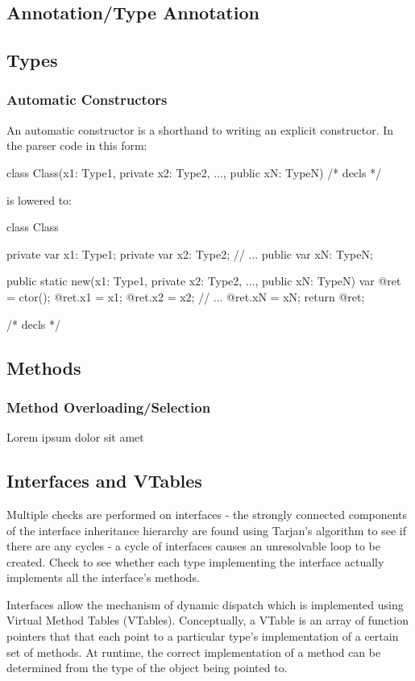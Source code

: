 \documentclass{article}
\begin{document}
\subsection{Annotation/Type Annotation}

\subsection{Types}
\subsubsection{Automatic Constructors}
An automatic constructor is a shorthand to writing an explicit constructor. In the parser code in this form:
\begin{sooplisting}
class Class(x1: Type1, private x2: Type2, ..., public xN: TypeN) { /* decls */ }
\end{sooplisting}
is lowered to:
\begin{sooplisting}
class Class {
	private var x1: Type1;
	private var x2: Type2;
	// ...
	public var xN: TypeN;
	
	public static new(x1: Type1, private x2: Type2, ..., public xN: TypeN) {
		var @ret = ctor();
		@ret.x1 = x1;
		@ret.x2 = x2;
		// ...
		@ret.xN = xN;
		return @ret;
	}
	
	/* decls */
}
\end{sooplisting}

\subsection{Methods}
\subsubsection{Method Overloading/Selection}
\label{sec:methodOverloadSelection}
Lorem ipsum dolor sit amet

\subsection{Interfaces and VTables}

Multiple checks are performed on interfaces - the strongly connected components of the interface inheritance hierarchy are found using Tarjan's algorithm to see if there are any cycles - a cycle of interfaces causes an unresolvable loop to be created. Check to see whether each type implementing the interface actually implements all the interface's methods.

Interfaces allow the mechanism of dynamic dispatch which is implemented using Virtual Method Tables (VTables). Conceptually, a VTable is an array of function pointers that that each point to a particular type's implementation of a certain set of methods. At runtime, the correct implementation of a method can be determined from the type of the object being pointed to.
\end{document}
